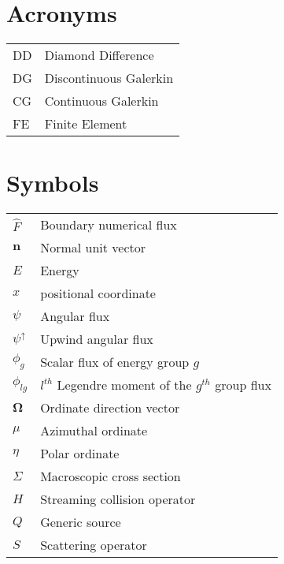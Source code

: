 
\section*{Acronyms}
\begin{tabular}{l l}
DD & Diamond Difference \\
DG & Discontinuous Galerkin \\
CG & Continuous Galerkin \\
FE & Finite Element
\end{tabular}

\section*{Symbols}
\begin{tabular}{l l}
$\hat F$ & Boundary numerical flux \\
$\mathbf n$ & Normal unit vector \\
$E$ & Energy \\
$x$ & positional coordinate \\
$\psi$ & Angular flux \\
$\psi^{\uparrow}$ & Upwind angular flux \\
$\phi_g$ & Scalar flux of energy group $g$ \\
$\phi_{lg}$ & $l^{th}$ Legendre moment of the $g^{th}$ group flux \\
$\mathbf \Omega$ & Ordinate direction vector \\
$\mu$ & Azimuthal ordinate \\
$\eta$ & Polar ordinate \\
$\Sigma$ & Macroscopic cross section \\
$H$ & Streaming collision operator \\
$Q$ & Generic source \\
$S$ & Scattering operator \\
\end{tabular}

\pagebreak
